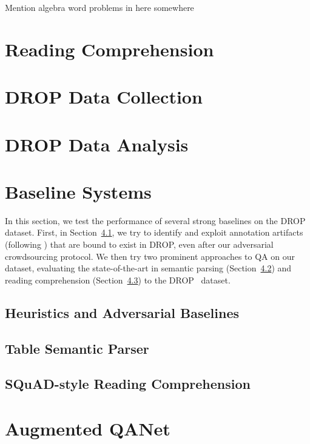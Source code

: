 \documentclass[11pt,a4paper]{article}
\newcommand{\secref}[1]{Section~\ref{sec:#1}}
\newcommand{\drop}[0]{DROP}
\begin{document}
Mention algebra word problems in here somewhere

\section{Reading Comprehension}


\section{DROP Data Collection}



\section{DROP Data Analysis}


\section{Baseline Systems}

In this section, we test the performance of several strong baselines on the
\drop~ dataset.
First, in \secref{heuristics},
we try to identify and exploit annotation artifacts (following \cite{artifacts,max,bestpaperinemnlp})
that are bound to exist in \drop, even after our adversarial crowdsourcing protocol.
We then try two prominent approaches to QA on our dataset, evaluating
the state-of-the-art in semantic parsing (\secref{semparse}) and reading comprehension (\secref{rc}) to the \drop~ dataset.

\subsection{Heuristics and Adversarial Baselines}
\label{sec:heuristics}


\subsection{Table Semantic Parser}
\label{sec:semparse}


\subsection{SQuAD-style Reading Comprehension}
\label{sec:rc}


\section{Augmented QANet}
\label{sec:model}

\end{document}
